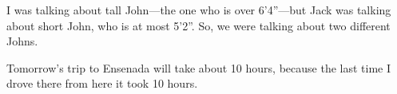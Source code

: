\begin{exercises}
\item I was talking about tall John---the one who is over 6'4''---but Jack was talking about short John, who is at most 5'2''. So, we were talking about two different Johns.

\item Tomorrow's trip to Ensenada will take about 10 hours, because the last time I drove there from here it took 10 hours. 

\end{exercises}

